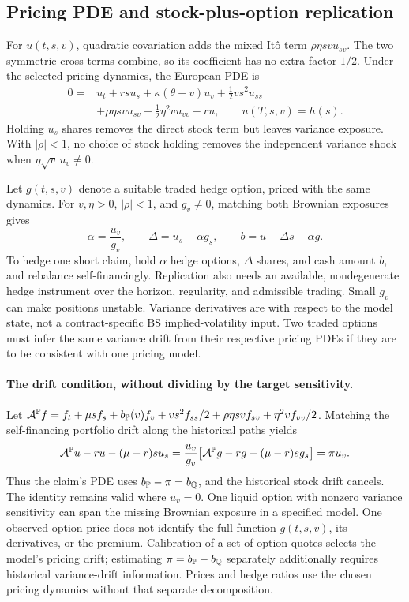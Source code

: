 \subsection{Pricing PDE and stock-plus-option replication}
For \(u(t,s,v)\), quadratic covariation adds the mixed It\^o term
\(\rho\eta svu_{sv}\). The two symmetric cross terms combine, so its
coefficient has no extra factor \(1/2\). Under the selected pricing
dynamics, the European PDE is
\[
\boxed{\begin{aligned}
0={}&u_t+rsu_s+\kappa(\theta-v)u_v+\tfrac12vs^2u_{ss}\\
&+\rho\eta svu_{sv}+\tfrac12\eta^2vu_{vv}-ru,
\qquad u(T,s,v)=h(s).
\end{aligned}}
\]
Holding \(u_s\) shares removes the direct stock term but leaves variance
exposure. With \(|\rho|<1\), no choice of stock holding removes the
independent variance shock when \(\eta\sqrt v\,u_v\ne0\).

Let \(g(t,s,v)\) denote a suitable traded hedge option, priced with
the same dynamics. For \(v,\eta>0\), \(|\rho|<1\), and \(g_v\ne0\),
matching both Brownian exposures gives
\[
\boxed{\alpha=\frac{u_v}{g_v},\qquad
\Delta=u_s-\alpha g_s,\qquad b=u-\Delta s-\alpha g.}
\]
To hedge one short claim, hold \(\alpha\) hedge options, \(\Delta\)
shares, and cash amount \(b\), and rebalance self-financingly. Replication
also needs an available, nondegenerate hedge instrument over the horizon,
regularity, and admissible trading. Small \(g_v\) can make positions
unstable. Variance derivatives are with respect to the model state, not
a contract-specific BS implied-volatility input. Two traded options must
infer the same variance drift from their respective pricing PDEs if they
are to be consistent with one pricing model.

\paragraph{The drift condition, without dividing by the target sensitivity.}
Let \(\mathcal A^{\mathbb{P}}f=f_t+\mu sf_s+b_{\mathbb{P}}(v)f_v+
vs^2f_{ss}/2+\rho\eta svf_{sv}+\eta^2vf_{vv}/2\).
Matching the self-financing portfolio drift along the historical paths yields
\[
\mathcal A^{\mathbb{P}}u-ru-(\mu-r)su_s
=\frac{u_v}{g_v}
\bigl[\mathcal A^{\mathbb{P}}g-rg-(\mu-r)sg_s\bigr]=\pi u_v.
\]
Thus the claim's PDE uses \(b_{\mathbb{P}}-\pi=b_{\mathbb{Q}}\), and the
historical stock drift cancels. The identity remains valid where \(u_v=0\).
One liquid option with nonzero variance sensitivity can span the missing
Brownian exposure in a specified model. One observed option price does
not identify the full function \(g(t,s,v)\), its derivatives, or the premium.
Calibration of a set of option quotes selects the model's pricing drift;
estimating \(\pi=b_{\mathbb{P}}-b_{\mathbb{Q}}\) separately additionally requires
historical variance-drift information. Prices and hedge ratios use the
chosen pricing dynamics without that separate decomposition.

